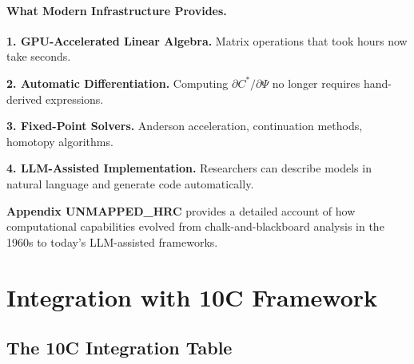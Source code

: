 \paragraph{What Modern Infrastructure Provides.}

\textbf{1. GPU-Accelerated Linear Algebra.}
Matrix operations that took hours now take seconds.

\textbf{2. Automatic Differentiation.}
Computing $\partial C^* / \partial \Psi$ no longer requires hand-derived expressions.

\textbf{3. Fixed-Point Solvers.}
Anderson acceleration, continuation methods, homotopy algorithms.

\textbf{4. LLM-Assisted Implementation.}
Researchers can describe models in natural language and generate code automatically.

\begin{cross-reference}
\textbf{Appendix UNMAPPED_HRC} provides a detailed account of how computational capabilities
evolved from chalk-and-blackboard analysis in the 1960s to today's LLM-assisted frameworks.
\end{cross-reference}



\section{Integration with 10C Framework}
\label{sec:comp-integration}


\subsection{The 10C Integration Table}

